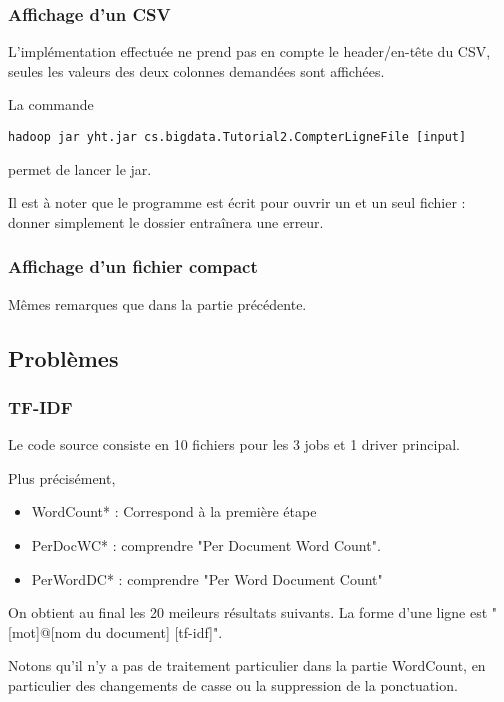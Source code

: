 \documentclass[french]{article}
\begin{document}
\subsubsection{Affichage d'un CSV}

L'implémentation effectuée ne prend pas en compte le header/en-tête du CSV, seules les valeurs des deux colonnes demandées sont affichées.

La commande
 \begin{verbatim}
hadoop jar yht.jar cs.bigdata.Tutorial2.CompterLigneFile [input] 
\end{verbatim} 

permet de lancer le jar.

Il est à noter que le programme est écrit pour ouvrir un et un seul fichier : donner simplement le dossier entraînera une erreur.

\subsubsection{Affichage d'un fichier compact}


Mêmes remarques que dans la partie précédente.



\subsection{Problèmes}
\subsubsection{TF-IDF}

Le code source consiste en 10 fichiers pour les 3 jobs et 1 driver principal.

Plus précisément,

\begin{itemize}
	\item WordCount* : Correspond à la première étape
	\item PerDocWC* : comprendre "Per Document Word Count".
	\item PerWordDC* : comprendre "Per Word Document Count"
\end{itemize}

On obtient au final les 20 meileurs résultats suivants. La forme d'une ligne est "[mot]@[nom du document]    [tf-idf]".

Notons qu'il n'y a pas de traitement particulier dans la partie WordCount, en particulier des changements de casse ou la suppression de la ponctuation.
\end{document}
